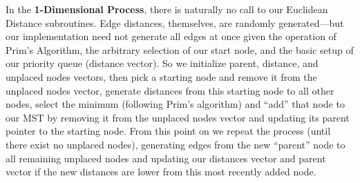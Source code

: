 \documentclass[conference]{styles/acmsiggraph}
\newcommand{\?}{\stackrel{?}{=}}
\begin{document}
In the \textbf{1-Dimensional Process}, there is naturally no call to our Euclidean Distance subroutines.  Edge distances, themselves, are randomly generated---but our implementation need not generate all edges at once given the operation of Prim's Algorithm, the arbitrary selection of our start node, and the basic setup of our priority queue (distance vector).  So we initialize parent, distance, and unplaced nodes vectors, then pick a starting node and remove it from the unplaced nodes vector, generate distances from this starting node to all other nodes, select the minimum (following Prim's algorithm) and \enquote{add} that node to our MST by removing it from the unplaced nodes vector and updating its parent pointer to the starting node.  From this point on we repeat the process (until there exist no unplaced nodes), generating edges from the new \enquote{parent} node to all remaining unplaced nodes and updating our distances vector and parent vector if the new distances are lower from this most recently added node.
\end{document}
